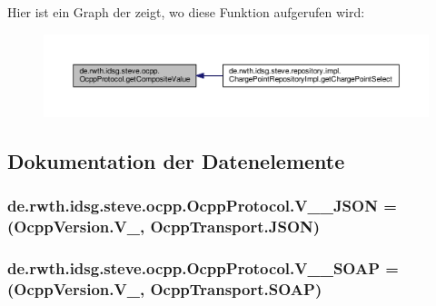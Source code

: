 Hier ist ein Graph der zeigt, wo diese Funktion aufgerufen wird\+:\nopagebreak
\begin{figure}[H]
\begin{center}
\leavevmode
\includegraphics[width=350pt]{enumde_1_1rwth_1_1idsg_1_1steve_1_1ocpp_1_1_ocpp_protocol_a95bc56bd40e0d2aa1935989a762e5501_icgraph}
\end{center}
\end{figure}




\subsection{Dokumentation der Datenelemente}
\hypertarget{enumde_1_1rwth_1_1idsg_1_1steve_1_1ocpp_1_1_ocpp_protocol_a0b890b1200cee602749371f323d0a686}{
\subsubsection[{V\+\_\+12\+\_\+\+J\+S\+O\+N}]{\setlength{\rightskip}{0pt plus 5cm}de.\+rwth.\+idsg.\+steve.\+ocpp.\+Ocpp\+Protocol.\+V\+\_\+\_\+\+J\+S\+O\+N =({\bf Ocpp\+Version.\+V\+\_}, {\bf Ocpp\+Transport.\+J\+S\+O\+N})}}\label{enumde_1_1rwth_1_1idsg_1_1steve_1_1ocpp_1_1_ocpp_protocol_a0b890b1200cee602749371f323d0a686}
\hypertarget{enumde_1_1rwth_1_1idsg_1_1steve_1_1ocpp_1_1_ocpp_protocol_a8d3c28a7f752ada8544f49a26fd75bf9}{
\subsubsection[{V\+\_\+12\+\_\+\+S\+O\+A\+P}]{\setlength{\rightskip}{0pt plus 5cm}de.\+rwth.\+idsg.\+steve.\+ocpp.\+Ocpp\+Protocol.\+V\+\_\+\_\+\+S\+O\+A\+P =({\bf Ocpp\+Version.\+V\+\_}, {\bf Ocpp\+Transport.\+S\+O\+A\+P})}}\label{enumde_1_1rwth_1_1idsg_1_1steve_1_1ocpp_1_1_ocpp_protocol_a8d3c28a7f752ada8544f49a26fd75bf9}
